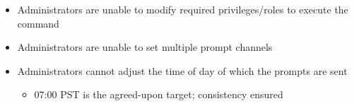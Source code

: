 \documentclass[7px]{article}
\begin{document}
{
  \small
  \begin{itemize}[label=\opentimes]
    \item Administrators are unable to modify required privileges/roles to execute the command
    \item Administrators are unable to set multiple prompt channels
    \item Administrators cannot adjust the time of day of which the prompts are sent 
      \footnotesize{
        \begin{itemize}
          \item 07:00 PST is the agreed-upon target; consistency ensured
        \end{itemize}
      }
  \end{itemize}
  \normalsize
}


\end{document}
